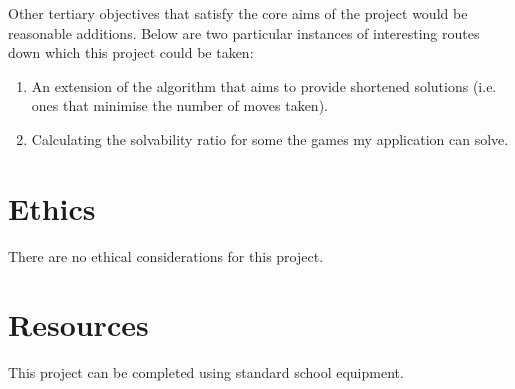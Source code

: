 \documentclass{article}
\begin{document}
Other tertiary objectives that satisfy the core aims of the project would be
reasonable additions. Below are two particular instances of interesting routes
down which this project could be taken:

\begin{enumerate}
	\item An extension of the algorithm that aims to provide shortened solutions
(i.e. ones that minimise the number of moves taken).
	\item Calculating the solvability ratio for some the games my application can
solve.
\end{enumerate}

\section{Ethics}

There are no ethical considerations for this project.

\section{Resources}

This project can be completed using standard school equipment.

\printbibliography
\end{document}
